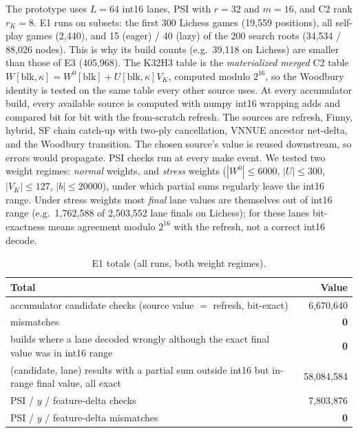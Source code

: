 The prototype uses $L=64$ int16 lanes, PSI with $r=32$ and $m=16$, and C2 rank $r_K=8$.
E1 runs on subsets: the first 300 Lichess games (19,559 positions), all self-play games (2,440), and 15 (eager) / 40 (lazy) of the 200 search roots (34,534 / 88,026 nodes).
This is why its build counts (e.g.\ 39,118 on Lichess) are smaller than those of E3 (405,968).
The K32H3 table is the \emph{materialized merged} C2 table $W[\mathrm{blk},\kappa]=W^0[\mathrm{blk}]+U[\mathrm{blk},\kappa]V_K$, computed modulo $2^{16}$, so the Woodbury identity is tested on the same table every other source uses.
At every accumulator build, every available source is computed with numpy int16 wrapping adds and compared bit for bit with the from-scratch refresh.
The sources are refresh, Finny, hybrid, SF chain catch-up with two-ply cancellation, VNNUE ancestor net-delta, and the Woodbury transition.
The chosen source's value is reused downstream, so errors would propagate.
PSI checks run at every make event.
We tested two weight regimes: \emph{normal} weights, and \emph{stress} weights ($|W^0|\le6000$, $|U|\le300$, $|V_K|\le127$, $|b|\le20000$), under which partial sums regularly leave the int16 range.
Under stress weights most \emph{final} lane values are themselves out of int16 range (e.g.\ 1,762,588 of 2,503,552 lane finals on Lichess); for these lanes bit-exactness means agreement modulo $2^{16}$ with the refresh, not a correct int16 decode.

\begin{table}[htbp]
\centering\small
\caption{E1 totals (all runs, both weight regimes).}\label{tab:e1}
\begin{tabular}{@{}lr@{}}
\toprule
Total & Value\\
\midrule
accumulator candidate checks (source value $=$ refresh, bit-exact) & 6,670,640\\
mismatches & \textbf{0}\\
builds where a lane decoded wrongly although the exact final value was in int16 range & \textbf{0}\\
(candidate, lane) results with a partial sum outside int16 but in-range final value, all exact & 58,084,584\\
PSI / $y$ / feature-delta checks & 7,803,876\\
PSI / $y$ / feature-delta mismatches & \textbf{0}\\
\bottomrule
\end{tabular}
\end{table}

